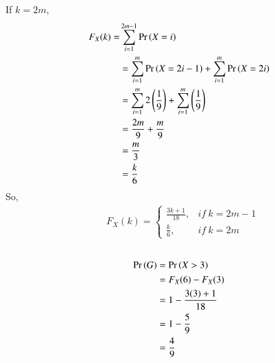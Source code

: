 \documentclass[journal,12pt,twocolumn]{IEEEtran}
\begin{document}
If $k = 2m$,
\begin{align}
    F_X (k) = &\sum_{i=1}^{2m-1}{\Pr\left(X=i\right)}
\\
    &= \sum_{i=1}^{m}{\Pr\left(X=2i-1\right)} + \sum_{i=1}^{m}{\Pr\left(X=2i\right)}\\
    &=\sum_{i=1}^{m}{2\left(\frac{1}{9}\right)} + \sum_{i=1}^{m}{\left(\frac{1}{9}\right)}\\
    &= \frac{2m}{9} + \frac{m}{9}\\
    &= \frac{m}{3}\\
    &= \frac{k}{6}
\end{align}
So,
\begin{align}
&F_X (k)= \begin{cases} 
      \frac{3k+1}{18}, & if\ k=2m-1 \\
      \frac{k}{6}, & if\ k=2m 
   \end{cases}
\end{align}\\
\begin{align}
  \Pr\left(G\right) &= \Pr\left(X>3\right)\\
  &=F_X (6) - F_X (3)\\
  &=1 - \frac{3(3)+1}{18}\\
  &= 1 - \frac{5}{9}\\
  &= \frac{4}{9}
  \end{align}
\end{document}

